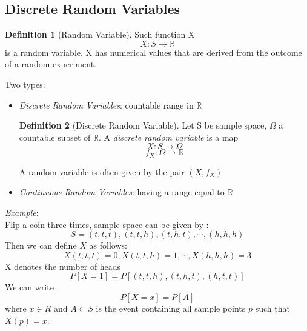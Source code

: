 \documentclass{article}
\theoremstyle{definition}
\newtheorem{definition}{Definition}[subsection]
\begin{document}
\subsection{Discrete Random Variables}
\begin{definition}[Random Variable]
    Such function X
    \begin{equation}
        X: S \rightarrow \mathbb{R}
    \end{equation}
    is a random variable. X has numerical values that are derived from the outcome of a random experiment.
\end{definition}
Two types:
\begin{itemize}
    \item \emph{Discrete Random Variables}: countable range in $\mathbb{R}$
        \begin{definition}[Discrete Random Variable]
            Let S be sample space, $\Omega$ a countable subset of $\mathbb{R}$.
            A \emph{discrete random variable} is a map
            \begin{equation}
                X: S\rightarrow \Omega
            \end{equation}
            \begin{equation}
                f_X: \Omega \rightarrow \mathbb{R}
            \end{equation}
        \end{definition}
        A random variable is often given by the pair $(X,f_X)$
    \item \emph{Continuous Random Variables}: having a range equal to $\mathbb{R}$
\end{itemize}
\emph{Example}:\\
Flip a coin three times, sample space can be given by :
\begin{equation}
    S={(t,t,t),(t,t,h),(t,h,t),\dotsm,(h,h,h)}
\end{equation}
Then we can define $X$ as follows:
\begin{equation}
    X(t,t,t)=0,X(t,t,h)=1,\dotsm,X(h,h,h)=3
\end{equation}
X denotes the number of heads
\begin{equation}
    P[X=1]=P[(t,t,h),(t,h,t),(h,t,t)]
\end{equation}
We can write
\begin{equation}
    P[X=x] = P[A]
\end{equation}
where $x \in R$ and $A \subset S$ is the event containing all sample points $p$ such that $X(p)=x$.
\end{document}
